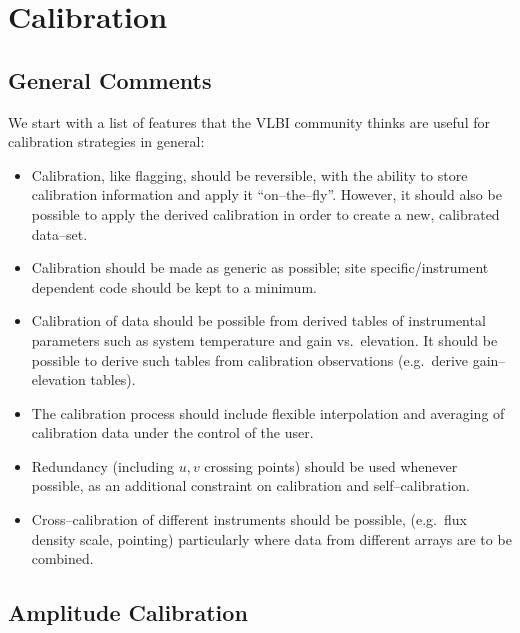 \section{Calibration}

\subsection{General Comments}

We start with a list of features that the VLBI community thinks are 
useful for calibration strategies in general:

\begin{itemize}
  
\item Calibration, like flagging, should be reversible, with the
  ability to store calibration information and apply it
  ``on--the--fly''. However, it should also be possible to apply
  the derived calibration in order to create a new,
  calibrated data--set.
  
\item Calibration should be made as generic as possible; site
  specific\slash instru\-ment dependent code should be kept to a
  minimum.
  
\item Calibration of data should be possible from derived tables of
  instrumental parameters such as system temperature and gain vs.\
  elevation. It should be possible to derive such tables from
  calibration observations (e.g.\ derive gain--elevation tables).
  
\item The calibration process should include flexible interpolation
  and averaging of calibration data under the control of the user.
  
\item Redundancy (including $u,\! v$ crossing points) should be used
  whenever possible, as an additional constraint on calibration and
  self--calibration.
  
\item Cross--calibration of different instruments should be possible,
  (e.g.\  flux density scale, pointing) particularly where data from
  different arrays are to be combined.

\end{itemize}

\subsection{Amplitude Calibration}

